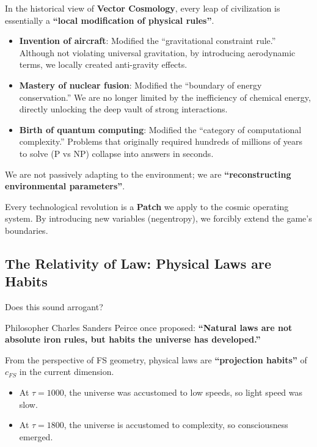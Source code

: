 In the historical view of \textbf{Vector Cosmology}, every leap of civilization is essentially a \textbf{``local modification of physical rules''}.

\begin{itemize}
\item \textbf{Invention of aircraft}: Modified the ``gravitational constraint rule.'' Although not violating universal gravitation, by introducing aerodynamic terms, we locally created anti-gravity effects.

\item \textbf{Mastery of nuclear fusion}: Modified the ``boundary of energy conservation.'' We are no longer limited by the inefficiency of chemical energy, directly unlocking the deep vault of strong interactions.

\item \textbf{Birth of quantum computing}: Modified the ``category of computational complexity.'' Problems that originally required hundreds of millions of years to solve (P vs NP) collapse into answers in seconds.
\end{itemize}

We are not passively adapting to the environment; we are \textbf{``reconstructing environmental parameters''}.

Every technological revolution is a \textbf{Patch} we apply to the cosmic operating system. By introducing new variables (negentropy), we forcibly extend the game's boundaries.

\subsection{The Relativity of Law: Physical Laws are Habits}

Does this sound arrogant?

Philosopher Charles Sanders Peirce once proposed: \textbf{``Natural laws are not absolute iron rules, but habits the universe has developed.''}

From the perspective of FS geometry, physical laws are \textbf{``projection habits''} of $c_{FS}$ in the current dimension.

\begin{itemize}
\item At $\tau=1000$, the universe was accustomed to low speeds, so light speed was slow.

\item At $\tau=1800$, the universe is accustomed to complexity, so consciousness emerged.
\end{itemize}

